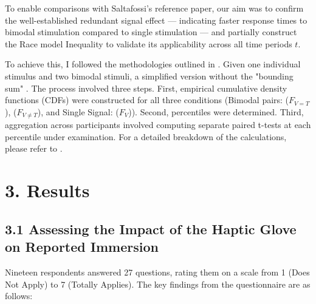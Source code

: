 \documentclass[12pt,oneside,openright]{report}
\begin{document}
To enable comparisons with Saltafossi's reference paper, our aim was to confirm the well-established redundant signal effect — indicating faster response times to bimodal stimulation compared to single stimulation — and partially construct the Race model Inequality to validate its applicability across all time periods $t$.

To achieve this, I followed the methodologies outlined in \cite{Ulrich2007,Innes2019ACA}. Given one individual stimulus and two bimodal stimuli, a simplified version without the "bounding sum" . The process involved three steps. First, empirical cumulative density functions (CDFs) were constructed for all three conditions (Bimodal pairs: ($F_{V=T}$), ($F_{V \neq T}$), and Single Signal: ($F_V$)). Second, percentiles were determined. Third, aggregation across participants involved computing separate paired t-tests at each percentile under examination. For a detailed breakdown of the calculations, please refer to \cite{Ulrich2007}.

\section*{3. Results}
\subsection*{3.1 Assessing the Impact of the Haptic Glove on Reported Immersion}
    
    Nineteen respondents answered 27 questions, rating them on a scale from 1 (Does Not Apply) to 7 (Totally Applies). The key findings from the questionnaire are as follows:
    
\end{document}

